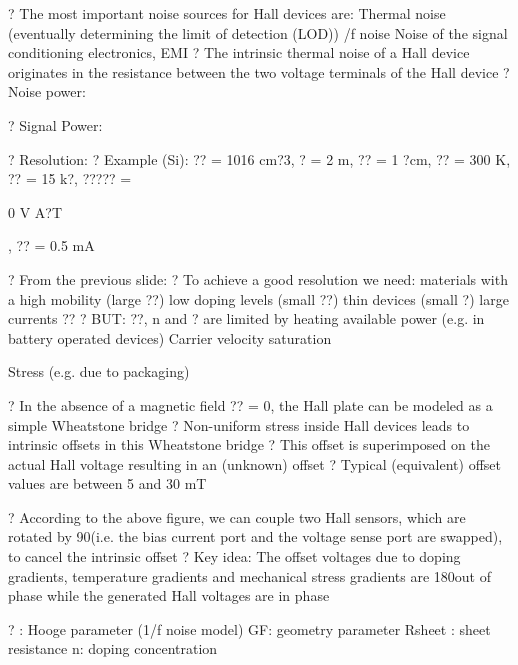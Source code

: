 \documentclass[2pt,landscape]{article}
\begin{document}
\begin{multicols*}{5}
?	The most important noise sources for Hall devices are:
\textbullet 	Thermal noise (eventually determining the limit of detection (LOD))
/f noise
\textbullet 	Noise of the signal conditioning electronics, EMI
?	The intrinsic thermal noise of a Hall device originates in the resistance 
between the two voltage terminals of the Hall device
?	Noise power:


?	Signal Power:


?	Resolution:
?	Example (Si):
?? = 1016 cm?3, ? = 2 \textbullet m, ?? = 1 ?cm, ?? = 300 K, ?? = 15 k?, ????? =


0 V 
A?T


, ?? = 0.5 mA



?	From the previous slide:
?	To achieve a good resolution we need:
\textbullet 	materials with a high mobility (large ??)
\textbullet 	low doping levels (small ??)
\textbullet 	thin devices (small ?)
\textbullet 	large currents ??
?	BUT: ??, n and ? are limited by
\textbullet 	heating
\textbullet 	available power (e.g. in battery operated devices)
\textbullet 	Carrier velocity saturation






Stress 
(e.g. due to 
packaging)









?	In the absence of a magnetic field ?? = 0, the Hall plate can be 
modeled as a simple Wheatstone bridge
?	Non-uniform stress inside Hall devices leads to intrinsic offsets in this 
Wheatstone bridge
?	This offset is superimposed on the actual Hall voltage resulting in an 
(unknown) offset
?	Typical (equivalent) offset values are between 5 and 30 mT





?	According to the above figure, we can couple two Hall sensors, which 
are rotated by 90\textbullet (i.e. the bias current port and the voltage sense port 
are swapped), to cancel the intrinsic offset
?	Key idea:
The offset voltages due to doping gradients, temperature gradients and 
mechanical stress gradients are 180\textbullet out of phase while the generated 
Hall voltages are in phase







? : Hooge parameter (1/f noise model) 
GF: geometry parameter
Rsheet : sheet resistance
n: doping concentration






\end{multicols*}
\end{document}
